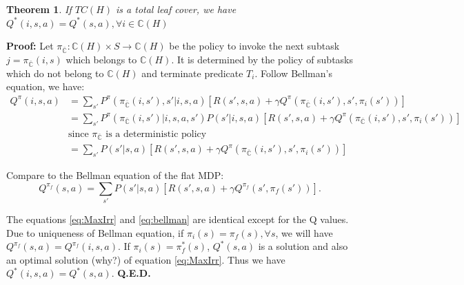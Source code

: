 \documentclass{article} %
\newtheorem{theorem}{Theorem}
\begin{document}

\begin{theorem}
    If $TC(H)$ is a total leaf cover, we have $Q^*(i, s, a) = Q^*(s, a), \forall i \in \mathbb{C}(H)$
\end{theorem}
\textbf{Proof:} Let $\pi_{\bar{\mathbb{C}}}: \mathbb{C}(H) \times S \rightarrow \mathbb{C}(H)$ be the policy to invoke
the next subtask $j = \pi_{\bar{\mathbb{C}}}(i, s)$ which belongs to $\mathbb{C}(H)$. It is determined
by the policy of subtasks which do not belong to $\mathbb{C}(H)$ and terminate predicate $T_i$. Follow Bellman's equation, we have:
\begin{align}
    Q^{\pi}(i, s, a) &= \sum_{s'} P^{\pi}(\pi_{\bar{\mathbb{C}}}(i, s'), s'|i, s, a) [R(s', s, a) + \gamma Q^{\pi}(\pi_{\bar{\mathbb{C}}}(i, s'), s', \pi_i(s'))]\\
    &=\sum_{s'}P^{\pi}(\pi_{\bar{\mathbb{C}}}(i, s')| i, s, a, s') P(s' | i, s, a)  [R(s', s, a) + \gamma Q^{\pi}(\pi_{\bar{\mathbb{C}}}(i, s'), s', \pi_i(s'))]\\
    &\mbox{since $\pi_{\bar{\mathbb{C}}}$ is a deterministic policy}\\
    &=\sum_{s'} P(s' | s, a) [R(s', s, a) + \gamma Q^{\pi}(\pi_{\bar{\mathbb{C}}}(i, s'), s', \pi_i(s'))]
    \label{eq:MaxIrr}
\end{align}

Compare to the Bellman equation of the flat MDP:
\begin{equation}
    Q^{\pi_f}(s, a) = \sum_{s'}P(s'|s, a)[R(s', s, a) + \gamma Q^{\pi_f}(s', \pi_f(s'))].
    \label{eq:bellman}
\end{equation}

The equations \ref{eq:MaxIrr} and \ref{eq:bellman} are identical except for the Q values.
Due to uniqueness of Bellman equation, if $\pi_i(s) = \pi_f(s), \forall s$, we will have $Q^{\pi_f}(s, a) = Q^{\pi_f}(i, s, a)$. 
If $\pi_i(s) = \pi^*_f(s)$, $Q^*(s, a)$ is a solution and also an optimal solution (why?) of equation \ref{eq:MaxIrr}.
Thus we have $Q^*(i, s, a) = Q^*(s, a)$. \textbf{Q.E.D.}
\end{document}
